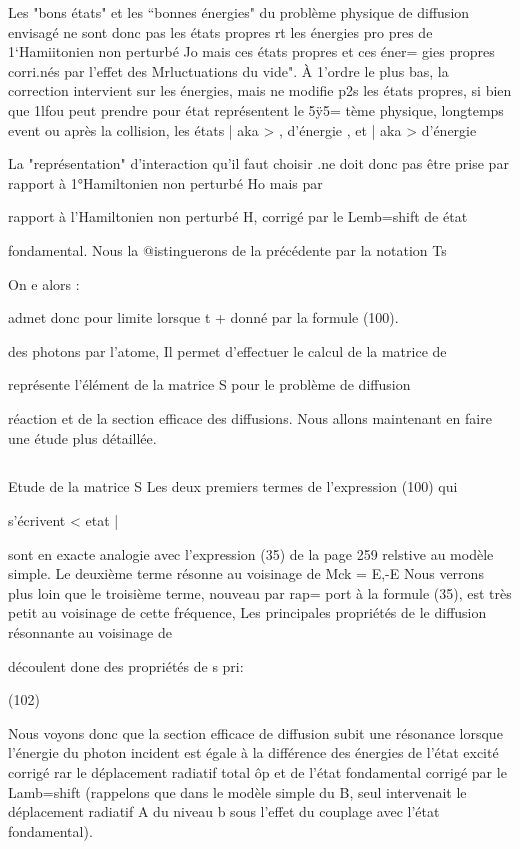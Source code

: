 Les "bons états" et les “bonnes énergies" du problème physique
de diffusion envisagé ne sont donc pas les états propres rt les énergies pro
pres de 1‘Hamiitonien non perturbé Jo mais ces états propres et ces éner=
gies propres corri.nés par l'effet des Mrluctuations du vide". À 1'ordre le
plus bas, la correction intervient sur les énergies, mais ne modifie p2s les
états propres, si bien que 1lfou peut prendre pour état représentent le 5ÿ5=
tème physique, longtemps event ou après la collision, les états | aka > ,
d'énergie , et | aka > d'énergie 

La "représentation" d'interaction qu'il faut choisir .ne doit
donc pas être prise par rapport à 1°Hamiltonien non perturbé Ho mais par

rapport à l'Hamiltonien non perturbé H, corrigé par le Lemb=shift de état


fondamental. Nous la @istinguerons de la précédente par la notation Ts

On e alors :

 admet donc pour limite lorsque t +
 donné par la formule (100).

des photons par l'atome, Il permet d'effectuer le calcul de la matrice de

représente l'élément de la matrice S pour le problème de diffusion

réaction et de la section efficace des diffusions.
Nous allons maintenant en faire une étude plus détaillée.

\subsection{} Etude de la matrice S%
Les deux premiers termes de l'expression (100) qui

s'écrivent
< etat |

sont en exacte analogie avec l'expression (35) de la page 259 relstive au
modèle simple. Le deuxième terme résonne au voisinage de Mck = E,-E
Nous verrons plus loin que le troisième terme, nouveau par rap=
port à la formule (35), est très petit au voisinage de cette fréquence, Les
principales propriétés de le diffusion résonnante au voisinage de

découlent done des propriétés de s pri:

(102)

Nous voyons donc que la section efficace de diffusion subit
une résonance lorsque l'énergie du photon incident est égale à la différence des énergies de l'état excité corrigé rar le déplacement radiatif total
ôp et de l'état fondamental corrigé par le Lamb=shift (rappelons que dans
le modèle simple du  B, seul intervenait le déplacement radiatif A du
niveau b sous l'effet du couplage avec l'état fondamental).

